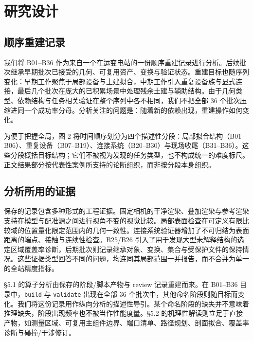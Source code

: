 \documentclass[10pt,a4paper]{article}
\begin{document}
\hypertarget{ux7814ux7a76ux8bbeux8ba1}{%
\section{研究设计}\label{ux7814ux7a76ux8bbeux8ba1}}

\hypertarget{ux987aux5e8fux91cdux5efaux8bb0ux5f55}{%
\subsection{顺序重建记录}\label{ux987aux5e8fux91cdux5efaux8bb0ux5f55}}

我们将 B01--B36
作为来自一个在运变电站的一份顺序重建记录进行分析。后续批次继承早期批次已接受的几何、可复用资产、变换与验证状态。重建目标也随序列变化：早期工作聚焦于局部设备与土建拟合，中期工作引入重复设备族与显式连接，最后几个批次在庞大的已积累场景中处理残余土建与辅助结构。由于几何类型、依赖结构与任务相关验证在整个序列中各不相同，我们不把全部
36
个批次压缩进同一个成功率分母。分析关注的问题是：随着新的依赖出现，重建操作如何变化。

为便于把握全局，图 2
将时间顺序划分为四个描述性分段：局部拟合结构（B01--B06）、重复设备（B07--B19）、连接系统（B20--B30）与现场收尾（B31--B36）。这些分段概括目标结构；它们不被视为发现的任务类型，也不构成统一的难度标尺。正文结果部分按代表性案例所支持的论断组织，而非按分段本身组织。

\hypertarget{ux5206ux6790ux6240ux7528ux7684ux8bc1ux636e}{%
\subsection{分析所用的证据}\label{ux5206ux6790ux6240ux7528ux7684ux8bc1ux636e}}

保存的记录包含多种形式的工程证据。固定相机的干净渲染、叠加渲染与参考渲染支持在模型与配准源之间进行视角不变的视觉比较。局部表面检查在可定义有限比较域的位置量化限定范围内的几何一致性。连接系统验证器增加了不可归结为表面距离的端点、接触与连续性检查。B25/B26
引入了用于发现大型未解释结构的选定区域覆盖率诊断，后期批次则记录继承对象、变换、集合与受保护文件的保持情况。这些证据类型回答不同的问题，均连同其局部范围一并报告，而不合并为单一的全站精度指标。

§5.1 的算子分析由保存的阶段/脚本产物与 review 记录重建而来。在 B01--B36
目录中，\texttt{build} 与 \texttt{validate} 出现在全部 36
个批次中，其他命名阶段则随目标而变化。我们将这份记录用作纵向分析的描述性导引。某个命名阶段的缺失并不意味着推理缺失，阶段出现频率也不被当作性能度量。§5.2
的机理性解读则立足于直接产物，如测量区域、可复用主组件边界、端口清单、路径规划、剖面拟合、覆盖率诊断与碰撞/干涉修订。
\end{document}
